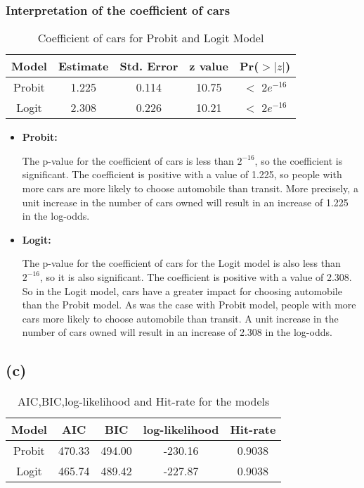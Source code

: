 \documentclass[a4paper]{article}
\begin{document}
\subsubsection*{Interpretation of the coefficient of cars}

\begin{table}[h!]
    \centering
    \begin{tabular}{|ccccc|}
        \hline
        \textbf{Model} & \textbf{Estimate} & \textbf{Std. Error} & \textbf{z value}& \textbf{Pr($>|z|$)} \\ \hline
        Probit & 1.225 & 0.114 & 10.75 & $<$ $2e^{-16}$ \\
        Logit & 2.308 & 0.226 & 10.21 & $<$ $2e^{-16}$ \\ \hline
    \end{tabular}
    \caption{Coefficient of cars for Probit and Logit Model}
    \label{tab:cars coeff}
\end{table}

\begin{itemize}
    \item \textbf{Probit:}
    
    The p-value for the coefficient of cars is less than $2^{-16}$, so the coefficient is significant. The coefficient is positive with a value of 1.225, so people with more cars are more likely to choose automobile than transit. More precisely, a unit increase in the number of cars owned will result in an increase of 1.225 in the log-odds.

    \item \textbf{Logit:}
    
    The p-value for the coefficient of cars for the Logit model is also less than $2^{-16}$, so it is also significant. The coefficient is positive with a value of 2.308. So in the Logit model, cars have a greater impact for choosing automobile than the Probit model. As was the case with Probit model, people with more cars more likely to choose automobile than transit. A unit increase in the number of cars owned will result in an increase of 2.308 in the log-odds.
\end{itemize}


\subsection*{(c)}

\begin{table}[h!]
    \centering
    \begin{tabular}{|ccccc|}
        \hline
        \textbf{Model} & \textbf{AIC} & \textbf{BIC} & \textbf{log-likelihood}& \textbf{Hit-rate} \\ \hline
        Probit & 470.33 & 494.00 & -230.16 & 0.9038 \\
        Logit & 465.74 & 489.42 & -227.87 & 0.9038 \\ \hline
    \end{tabular}
    \caption{AIC,BIC,log-likelihood and Hit-rate for the models}
    \label{tab:model metrics}
\end{table}
\end{document}
